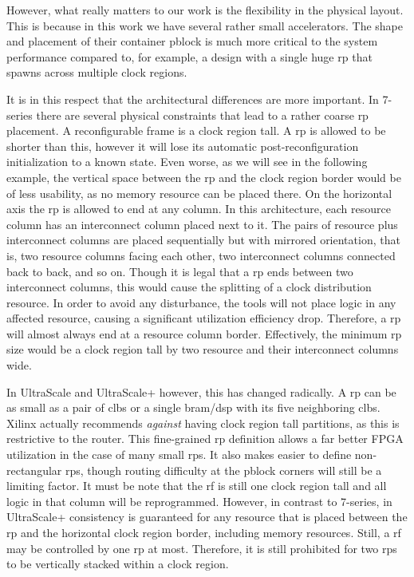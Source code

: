 However, what really matters to our work is the flexibility in the physical layout.
This is because in this work we have several rather small accelerators.
The shape and placement of their container \gls{pblock} is much more critical
to the system performance compared to, for example, a design with a single huge
\gls{rp} that spawns across multiple clock regions.

It is in this respect that the architectural differences are more important.
In 7-series there are several physical constraints that lead to a rather
coarse \gls{rp} placement.
A reconfigurable frame is a clock region tall.
A \gls{rp} is allowed to be shorter than this,
however it will lose its automatic post-reconfiguration initialization to a known state.
Even worse, as we will see in the following example,
the vertical space between the \gls{rp} and the clock region border would be of less usability,
as no memory resource can be placed there.
On the horizontal axis the \gls{rp} is allowed to end at any column.
In this architecture, each resource column has an interconnect column placed next to it.
The pairs of resource plus interconnect columns are placed sequentially but with mirrored orientation,
that is, two resource columns facing each other, two interconnect columns connected back to back,
and so on.
Though it is legal that a \gls{rp} ends between two interconnect columns,
this would cause the splitting of a clock distribution resource.
In order to avoid any disturbance, the tools will not place logic in any affected resource,
causing a significant utilization efficiency drop. Therefore, a \gls{rp}
will almost always end at a resource column border. Effectively, the minimum \gls{rp}
size would be a clock region tall by two resource and their interconnect columns wide.

In UltraScale and UltraScale+ however, this has changed radically. A \gls{rp}
can be as small as a pair of \glspl{clb} or a single \gls{bram}/\gls{dsp} with
its five neighboring \glspl{clb}. Xilinx actually recommends \emph{against} having
clock region tall partitions, as this is restrictive to the router.
This fine-grained \gls{rp} definition allows
a far better FPGA utilization in the case of many small \glspl{rp}.
It also makes easier to define non-rectangular \glspl{rp},
though routing difficulty at the \gls{pblock} corners will still be a limiting factor.
It must be note that the \gls{rf} is still one clock region tall and all logic in
that column will be reprogrammed. However, in contrast to 7-series, in UltraScale+
consistency is guaranteed for any resource that is placed between the \gls{rp}
and the horizontal clock region border, including memory resources.
Still, a \gls{rf} may be controlled by one \gls{rp} at most. Therefore,
it is still prohibited for two \glspl{rp} to be vertically stacked within a clock region.

